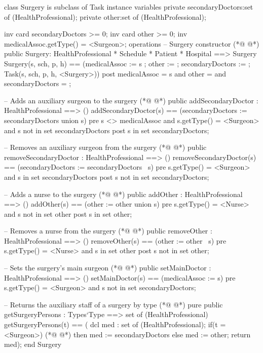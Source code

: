 \begin{vdmpp}[breaklines=true]
class Surgery is subclass of Task
instance variables
  private secondaryDoctors:set of (HealthProfessional);
  private other:set of (HealthProfessional);
  
  inv card secondaryDoctors >= 0;
  inv card other >= 0;
  inv medicalAssoc.getType() = <Surgeon>;
operations
 -- Surgery constructor
(*@
\label{Surgery:11}
@*)
 public Surgery: HealthProfessional * Schedule * Patient * Hospital ==> Surgery
  Surgery(s, sch, p, h) == (medicalAssoc := s ; other := {}; secondaryDoctors := {}; Task(s, sch, p, h, <Surgery>))
 post medicalAssoc = s and other = {} and secondaryDoctors = {};
 
 -- Adds an auxiliary surgeon to the surgery
(*@
\label{addSecondaryDoctor:16}
@*)
 public addSecondaryDoctor : HealthProfessional ==> ()
  addSecondaryDoctor(s) == (secondaryDoctors := secondaryDoctors union {s})
 pre s <> medicalAssoc and s.getType() = <Surgeon> and  s not in set secondaryDoctors
 post s in set secondaryDoctors;
 
 -- Removes an auxiliary surgeon from the surgery
(*@
\label{removeSecondaryDoctor:22}
@*)
 public removeSecondaryDoctor : HealthProfessional ==> ()
  removeSecondaryDoctor(s) == (secondaryDoctors := secondaryDoctors \ {s})
 pre s.getType() = <Surgeon> and s in set secondaryDoctors
 post s not in set secondaryDoctors;
 
 -- Adds a nurse to the surgery
(*@
\label{addOther:28}
@*)
 public addOther : HealthProfessional ==> ()
  addOther(s) == (other := other union {s})
 pre s.getType() = <Nurse> and s not in set other
 post s in set other;
 
 -- Removes a nurse from the surgery
(*@
\label{removeOther:34}
@*)
 public removeOther : HealthProfessional ==> ()
  removeOther(s) == (other := other \ {s})
 pre s.getType() = <Nurse> and s in set other
 post s not in set other;
 
 -- Sets the surgery's main surgeon
(*@
\label{setMainDoctor:40}
@*)
 public setMainDoctor : HealthProfessional ==> ()
  setMainDoctor(s) == (medicalAssoc := s)
 pre s.getType() = <Surgeon> and s not in set secondaryDoctors;
 
 -- Returns the auxiliary staff of a surgery by type
(*@
\label{getMainDoctor:45}
@*)
 pure public getSurgeryPersons : Types`Type ==> set of (HealthProfessional)
  getSurgeryPersons(t) == (
               dcl med : set of (HealthProfessional);
               if(t = <Surgeon>)
(*@
\label{getSurgeryPersons:49}
@*)
                then med := secondaryDoctors
               else
                med := other;
               return med);
end Surgery
\end{vdmpp}
